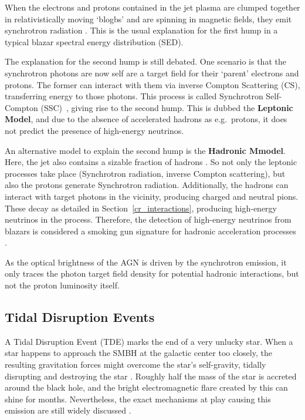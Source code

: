 When the electrons and protons contained in the jet plasma are clumped together in relativistically moving `blogbs' and are spinning in magnetic fields, they emit synchrotron radiation . This is the usual explanation for the first hump in a typical blazar spectral energy distribution (SED).

The explanation for the second hump is still debated. One scenario is that the synchrotron photons are now self are a target field for their `parent' electrons and protons. The former can interact with them via inverse Compton Scattering (CS), transferring energy to those photons. This process is called Synchrotron Self-Compton (SSC)~\cite{Spurio2018}, giving rise to the second hump. This is dubbed the \textbf{Leptonic Model}, and due to the absence of accelerated hadrons as e.g.\ protons, it does not predict the presence of high-energy neutrinos.

An alternative model to explain the second hump is the \textbf{Hadronic Mmodel}. Here, the jet also contains a sizable fraction of hadrons . So not only the leptonic processes take place (Synchrotron radiation, inverse Compton scattering), but also the protons generate Synchrotron radiation. Additionally, the hadrons can interact with target photons in the vicinity, producing charged and neutral pions. These decay as detailed in Section~\ref{cr_interactions}, producing high-energy neutrinos in the process. Therefore, the detection of high-energy neutrinos from blazars is considered a smoking gun signature for hadronic acceleration processes .

As the optical brightness of the AGN is driven by the synchrotron emission, it only traces the photon target field density for potential hadronic interactions, but not the proton luminosity itself.

\subsection{Tidal Disruption Events}

A Tidal Disruption Event (TDE) marks the end of a very unlucky star. When a star happens to approach the SMBH at the galactic center too closely, the resulting gravitation forces might overcome the star's self-gravity, tidally disrupting and destroying the star . Roughly half the mass of the star is accreted around the black hole, and the bright electromagnetic flare created by this can shine for months. Nevertheless, the exact mechanisms at play causing this emission are still widely discussed .

